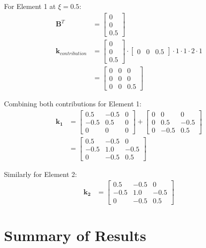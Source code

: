 \documentclass[12pt,a4paper]{article}
\begin{document}
For Element 1 at $\xi = 0.5$:
\begin{align}
\mathbf{B}^T &= \begin{bmatrix} 0 \\ 0 \\ 0.5 \end{bmatrix} \\
\mathbf{k}_{contribution} &= \begin{bmatrix} 0 \\ 0 \\ 0.5 \end{bmatrix} \cdot \begin{bmatrix} 0 & 0 & 0.5 \end{bmatrix} \cdot 1 \cdot 1 \cdot 2 \cdot 1 \\
&= \begin{bmatrix} 0 & 0 & 0 \\ 0 & 0 & 0 \\ 0 & 0 & 0.5 \end{bmatrix}
\end{align}

Combining both contributions for Element 1:
\begin{align}
\mathbf{k_1} &= \begin{bmatrix} 0.5 & -0.5 & 0 \\ -0.5 & 0.5 & 0 \\ 0 & 0 & 0 \end{bmatrix} + \begin{bmatrix} 0 & 0 & 0 \\ 0 & 0.5 & -0.5 \\ 0 & -0.5 & 0.5 \end{bmatrix} \\
&= \begin{bmatrix} 0.5 & -0.5 & 0 \\ -0.5 & 1.0 & -0.5 \\ 0 & -0.5 & 0.5 \end{bmatrix}
\end{align}

Similarly for Element 2:
\begin{align}
\mathbf{k_2} &= \begin{bmatrix} 0.5 & -0.5 & 0 \\ -0.5 & 1.0 & -0.5 \\ 0 & -0.5 & 0.5 \end{bmatrix}
\end{align}

\section{Summary of Results}
\end{document}
